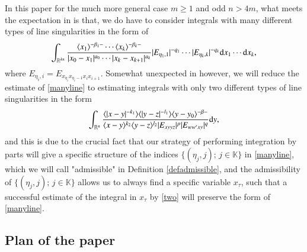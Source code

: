 \documentclass[11pt,reqno]{amsart}
\def\d{{\rm d}}
\numberwithin{equation}{section}
\theoremstyle{definition}
\begin{document}
In this paper for the much more general case $m\geq1$ and odd $n>4m$, what meets the expectation in \cite{EG10} is that, we do have to consider integrals with many different types of line singularities in the form of
\begin{equation}\label{manyline}
	\int_{\mathbb{R}^{kn}}\frac{\langle x_1\rangle^{-\beta_1-}\cdots\langle x_k\rangle^{-\beta_k-}}{|x_0-x_1|^{a_0}\cdots|x_k-x_{k+1}|^{a_k}}|E_{\eta_1,1}|^{-q_1}\cdots|E_{\eta_k,k}|^{-q_k}\d x_1\cdots \d x_k,
\end{equation}
where $E_{\eta_i,i}=E_{x_{\eta_i}x_{\eta_i-1}x_ix_{i+1}}$. Somewhat unexpected in \cite{EG10} however, we will reduce the estimate of \eqref{manyline} to estimating integrals with only two different types of line singularities in the form
\begin{equation}\label{two}
		\int_{\mathbb{R}^n}\frac{\langle|x-y|^{-k_1}\rangle\langle|y-z|^{-l_1}\rangle\langle y-y_0\rangle^{-\beta-}}{\langle x-y\rangle^{k_2}\langle y-z\rangle^{l_2}|E_{xyyz}|^p|E_{ww'xy}|^q}\d y,
\end{equation}
and this is due to the crucial fact that our strategy of performing integration by parts will give a specific structure of the indices $\{(\eta_j,j);\,j\in\mathbb{K}\}$ in \eqref{manyline}, which we will call "admissible" in Definition \ref{defadmissible}, and the admissibility of $\{(\eta_j,j);\,j\in\mathbb{K}\}$ allows us to always find a specific variable $x_\tau$, such that a successful estimate of the integral in $x_\tau$ by \eqref{two} will preserve the form of \eqref{manyline}.

\subsection{Plan of the paper}\
\end{document}
